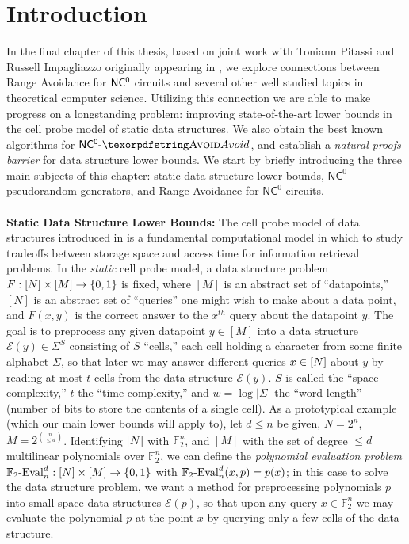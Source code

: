 %

\section{Introduction}
In the final chapter of this thesis, based on joint work with Toniann Pitassi and Russell Impagliazzo originally appearing in \cite{KPI25}, we explore connections between Range Avoidance for $\cl{NC^0}$ circuits and several other well studied topics in theoretical computer science. Utilizing this connection we are able to make progress on a longstanding problem: improving state-of-the-art lower bounds in the cell probe model of static data structures. We also obtain the best known algorithms for $\cl{NC^0}\dash \avoid$, and establish a \emph{natural proofs barrier} for data structure lower bounds. We start by briefly introducing the three main subjects of this chapter: static data structure lower bounds, $\mathsf{NC}^0$ pseudorandom generators, and Range Avoidance for $\mathsf{NC}^0$ circuits. 
~\\~\\
{\bf \noindent Static Data Structure Lower Bounds:} 
The cell probe model of data structures introduced in \cite{eliasflower,Yao} is a fundamental computational model in which to study tradeoffs between storage space and access time for information retrieval problems. In the \emph{static} cell probe model, a data structure problem $F: [N] \times [M] \to \{0,1\}$ is fixed, where $[M]$ is an abstract set of ``datapoints,'' $[N]$ is an abstract set of ``queries'' one might wish to make about a data point, and $F(x,y)$ is the correct answer to the $x^{th}$ query about the datapoint $y$. The goal is to preprocess any given datapoint $y\in [M]$ into a data structure $\mathcal{E}(y) \in \Sigma^S$ consisting of $S$ ``cells,'' each cell holding a character from some finite alphabet $\Sigma$, so that later we may answer different queries $x \in [N]$ about $y$ by reading at most $t$ cells from the data structure $\mathcal{E}(y)$. $S$ is called the ``space complexity,'' $t$ the ``time complexity,'' and $w=\log|\Sigma|$ the ``word-length'' (number of bits to store the contents of a single cell).
As a prototypical example (which our main lower bounds will apply to), let $d \leq n$ be given, $N=2^n$, $M = 2^{\binom{n}{\leq d}}$. Identifying $[N]$ with $\mathbb{F}_2^n$, and $[M]$ with the set of degree $\leq d$ multilinear polynomials over $\mathbb{F}_2^n$, we can define the \emph{polynomial evaluation problem} $\mathbb{F}_2\text{-}\mathrm{Eval}_n^d:[N] \times [M] \to \{0,1\}$ with $\mathbb{F}_2\text{-}\mathrm{Eval}_n^d(x,p)=p(x)$; in this case to solve the data structure problem, we want a method for preprocessing polynomials $p$ into small space data structures $\mathcal{E}(p)$, so that upon any query $x \in \mathbb{F}_2^n$ we may evaluate the polynomial $p$ at the point $x$ by querying only a few cells of the data structure.

